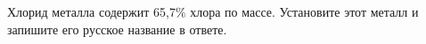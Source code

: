 
Хлорид металла содержит 65,7$\%$ хлора по массе. Установите этот металл и запишите его русское название в ответе.

